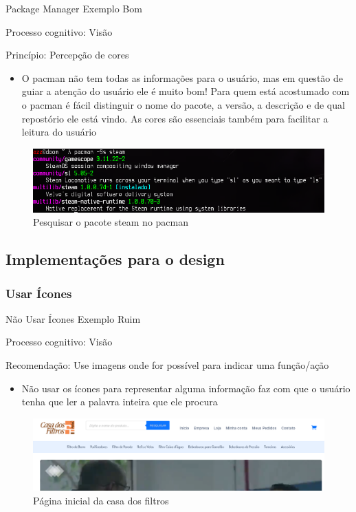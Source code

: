 \documentclass{beamer}
\begin{document}
\begin{frame}{Package Manager Exemplo Bom}

Processo cognitivo: Visão

Princípio: Percepção de cores

\begin{itemize}
    \item O pacman não tem todas as informações para o usuário, mas em questão de guiar a atenção do usuário ele é muito bom! Para quem está acostumado com o pacman é fácil distinguir o nome do pacote, a versão, a descrição e de qual repostório ele está vindo. As cores são essenciais também para facilitar a leitura do usuário
\end{itemize}
\begin{figure}
    \centering
    \includegraphics[scale=0.5]{images/Pacman-search.png}
    \caption{Pesquisar o pacote steam no pacman}
\end{figure}

\end{frame}

\subsection{Implementações para o design}
\subsubsection{Usar Ícones}
\begin{frame}{Não Usar Ícones Exemplo Ruim}

Processo cognitivo: Visão

Recomendação: Use imagens onde for possível para indicar uma função/ação

\begin{itemize}
    \item Não usar os ícones para representar alguma informação faz com que o usuário tenha que ler a palavra inteira que ele procura
\end{itemize}
\begin{figure}
    \centering
    \includegraphics[scale=0.3]{images/casa-dos-filtros.png}
    \caption{Página inicial da casa dos filtros}
\end{figure}

\end{frame}
\end{document}
